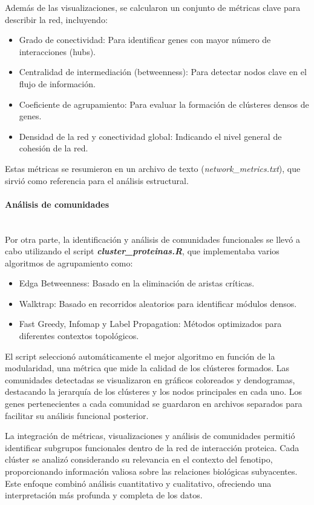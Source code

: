 Además de las visualizaciones, se calcularon un conjunto de métricas clave para describir la red, incluyendo:

\begin{itemize}
	\item Grado de conectividad: Para identificar genes con mayor número de interacciones (hubs).
	\item Centralidad de intermediación (betweenness): Para detectar nodos clave en el flujo de información.
	\item Coeficiente de agrupamiento: Para evaluar la formación de clústeres densos de genes.
	\item Densidad de la red y conectividad global: Indicando el nivel general de cohesión de la red.
\end{itemize}

Estas métricas se resumieron en un archivo de texto (\textit{network\_metrics.txt}), que sirvió como referencia para el análisis estructural.

\paragraph{Análisis de comunidades} \mbox{}\\

Por otra parte, la identificación y análisis de comunidades funcionales se llevó a cabo utilizando el script \textbf{\textit{cluster\_proteinas.R}}, que implementaba varios algoritmos de agrupamiento como:

\begin{itemize}
	\item Edga Betweenness: Basado en la eliminación de aristas críticas.
	\item Walktrap: Basado en recorridos aleatorios para identificar módulos densos.
	\item Fast Greedy, Infomap y Label Propagation: Métodos optimizados para diferentes contextos topológicos.
\end{itemize}

El script seleccionó automáticamente el mejor algoritmo en función de la modularidad, una métrica que mide la calidad de los clústeres formados. Las comunidades detectadas se visualizaron en gráficos coloreados y dendogramas, destacando la jerarquía de los clústeres y los nodos principales en cada uno. Los genes pertenecientes a cada comunidad se guardaron en archivos separados para facilitar su análisis funcional posterior.

La integración de métricas, visualizaciones y análisis de comunidades permitió identificar subgrupos funcionales dentro de la red de interacción proteica. Cada clúster se analizó considerando su relevancia en el contexto del fenotipo, proporcionando información valiosa sobre las relaciones biológicas subyacentes. Este enfoque combinó análisis cuantitativo y cualitativo, ofreciendo una interpretación más profunda y completa de los datos.

